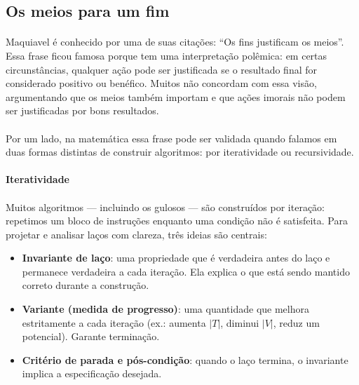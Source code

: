 \documentclass[12pt,a4paper]{article}
\def\emph#1{#1}%
\begin{document}
\subsection{Os meios para um fim}

\paragraph{}
Maquiavel é conhecido por uma de suas citações: ``Os fins justificam os meios''. Essa frase ficou famosa porque tem uma interpretação polêmica: em certas circunstâncias, qualquer ação pode ser justificada se o resultado final for considerado positivo ou benéfico. Muitos não concordam com essa visão, argumentando que os meios também importam e que ações imorais não podem ser justificadas por bons resultados.

\paragraph{}
Por um lado, na matemática essa frase pode ser validada quando falamos em duas formas distintas de construir algoritmos: por \emph{iteratividade} ou \emph{recursividade}.

\paragraph{Iteratividade}
\paragraph{}
Muitos algoritmos — incluindo os gulosos — são construídos por \emph{iteração}: repetimos um bloco de instruções enquanto uma condição não é satisfeita. Para projetar e analisar laços com clareza, três ideias são centrais:

\begin{itemize}\setlength{\itemsep}{2pt}
    \item \textbf{Invariante de laço}: uma propriedade que é verdadeira antes do laço e permanece verdadeira a cada iteração. Ela explica \emph{o que} está sendo mantido correto durante a construção.
    \item \textbf{Variante (medida de progresso)}: uma quantidade que melhora estritamente a cada iteração (ex.: aumenta $|T|$, diminui $|V|$, reduz um potencial). Garante \emph{terminação}.
    \item \textbf{Critério de parada e pós-condição}: quando o laço termina, o invariante implica a especificação desejada.
\end{itemize}
\end{document}
